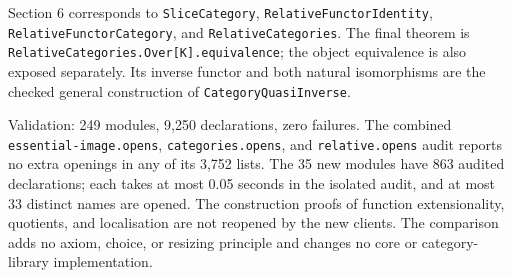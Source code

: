 \documentclass[11pt]{amsart}
\theoremstyle{definition}\newtheorem{definition}[theorem]{Definition}
\begin{document}
Section 6 corresponds to \texttt{SliceCategory},
\texttt{RelativeFunctorIdentity}, \texttt{RelativeFunctorCategory},
and \texttt{RelativeCategories}. The final theorem is
\texttt{RelativeCategories.Over[K].equivalence}; the object equivalence
is also exposed separately. Its inverse functor and both natural
isomorphisms are the checked general construction of
\texttt{CategoryQuasiInverse}.

Validation: 249 modules, 9,250 declarations, zero failures. The combined
\texttt{essential-image.opens}, \texttt{categories.opens}, and
\texttt{relative.opens} audit reports no extra openings in any of its
3,752 lists. The 35 new modules have 863 audited declarations; each takes
at most 0.05 seconds in the isolated audit, and at most 33 distinct
names are opened. The construction proofs of function extensionality,
quotients, and localisation are not reopened by the new clients.
The comparison adds no axiom, choice, or resizing principle and changes
no core or category-library implementation.
\par\endgroup
\end{document}
